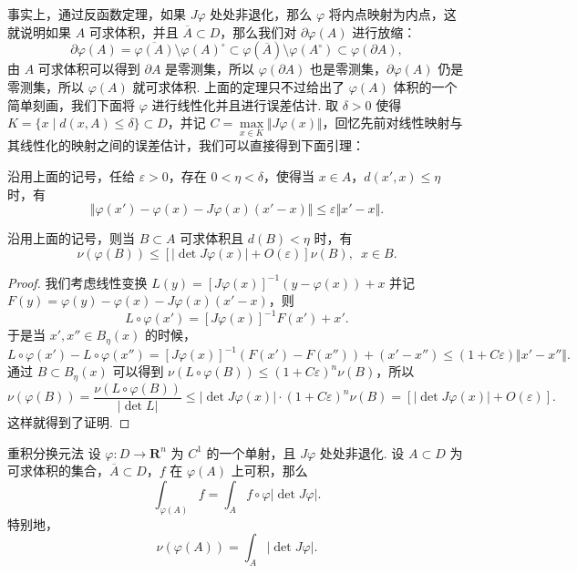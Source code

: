 事实上，通过反函数定理，如果 $J\varphi$ 处处非退化，那么 $\varphi$ 将内点映射为内点，这就说明如果 $A$ 可求体积，并且 $\overline{A}\subset D$，那么我们对 $\partial \varphi(A)$ 进行放缩：\[\partial \varphi(A) = \overline{\varphi(A)}\setminus \varphi(A)^{\circ} \subset \varphi(\overline{A})\setminus \varphi(A^{\circ}) \subset \varphi(\partial A),\]
由 $A$ 可求体积可以得到 $\partial A$ 是零测集，所以 $\varphi(\partial A)$ 也是零测集，$\partial \varphi(A)$ 仍是零测集，所以 $\varphi(A)$ 就可求体积. 上面的定理只不过给出了 $\varphi(A)$ 体积的一个简单刻画，我们下面将 $\varphi$ 进行线性化并且进行误差估计. 取 $\delta > 0$ 使得 $K = \{x \mid d(x, A) \leqslant \delta\} \subset D$，并记 $C = \max\limits_{x\in K}\Vert J\varphi(x)\Vert$，回忆先前对线性映射与其线性化的映射之间的误差估计，我们可以直接得到下面引理：

\begin{lemma}{}{}
    沿用上面的记号，任给 $\varepsilon >0$，存在 $0<\eta <\delta$，使得当 $x\in A$，$d(x', x)\leqslant \eta$ 时，有 \[\Vert \varphi(x') - \varphi(x) - J\varphi(x)(x' - x)\Vert\leqslant \varepsilon\Vert x' - x\Vert.\]
\end{lemma}

\begin{lemma}{}{}
    沿用上面的记号，则当 $B\subset A$ 可求体积且 $d(B) < \eta$ 时，有 \[\nu(\varphi(B)) \leqslant \left[\lvert \det J\varphi(x)\rvert + O(\varepsilon)\right]\nu(B),\enspace x\in B.\]
\end{lemma}

\begin{proof}
    我们考虑线性变换 $L(y) = \left[J\varphi(x)\right]^{-1}(y - \varphi(x)) + x$ 并记 $F(y) = \varphi(y) - \varphi(x) - J\varphi(x)(x'-x)$，则 \[L\circ\varphi(x') = \left[J\varphi(x)\right]^{-1} F(x') + x'.\]
    于是当 $x', x''\in B_\eta(x)$ 的时候，\[L\circ\varphi(x') - L\circ\varphi(x'') = \left[J\varphi(x)\right]^{-1} (F(x') - F(x'')) + (x' - x'')\leqslant (1 + C\varepsilon)\Vert x' - x''\Vert.\]
    通过 $B\subset B_\eta(x)$ 可以得到 $\nu(L\circ\varphi(B)) \leqslant (1 + C\varepsilon)^n\nu(B)$，所以\[\nu(\varphi(B)) = \frac{\nu(L\circ\varphi(B))}{\lvert \det L\rvert}\leqslant \lvert \det J\varphi(x)\rvert \cdot (1 + C\varepsilon)^n\nu(B) = \left[\lvert \det J\varphi(x)\rvert + O(\varepsilon)\right].\]
    这样就得到了证明.
\end{proof}

\begin{theorem}{重积分换元法}{}
    设 $\varphi\colon D\to \mathbf{R}^n$ 为 $C^1$ 的一个单射，且 $J\varphi$ 处处非退化. 设 $A\subset D$ 为可求体积的集合，$\overline{A}\subset D$，$f$ 在 $\varphi(A)$ 上可积，那么\[\int_{\varphi(A)}f = \int_A f\circ \varphi\lvert \det J\varphi\rvert.\]
    特别地，\[\nu(\varphi(A)) = \int_A \lvert \det J\varphi\rvert.\]
\end{theorem}


